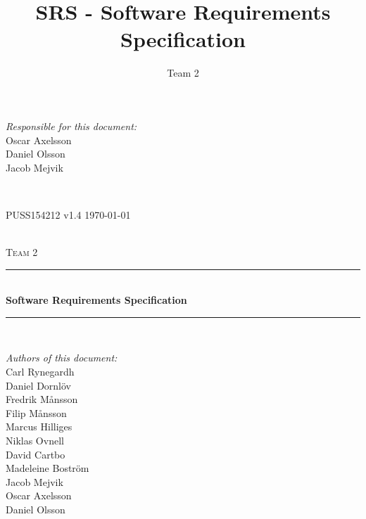\documentclass[a4paper]{article}
\title{SRS - Software Requirements Specification}
\author{Team 2}
\begin{document}
\begin{titlepage}
\newcommand{\HRule}{\rule{\linewidth}{0.5mm}}

\begin{minipage}{0.5\textwidth}
\begin{flushleft} %
\textit{Responsible for this document:}\\
Oscar Axelsson \\
Daniel Olsson \\
Jacob Mejvik
\end{flushleft}
\end{minipage}
~
\begin{minipage}{0.4\textwidth}
\begin{flushright}
PUSS154212 v1.4
\today
\end{flushright}
\end{minipage}\\[3cm]

\centering
\textsc{\LARGE Team 2}\\[0.5cm]

\HRule \\[0.4cm]
{ \huge \bfseries Software Requirements Specification}\\[0.4cm] %
\HRule \\[1.5cm]

\vfill
\begin{flushleft}
\textit{Authors of this document:}\\
Carl Rynegardh \\
Daniel Dornlöv \\
Fredrik Månsson \\
Filip Månsson \\
Marcus Hilliges \\
Niklas Ovnell \\
David Cartbo \\
Madeleine Boström \\
Jacob Mejvik \\
Oscar Axelsson \\
Daniel Olsson
\end{flushleft}



\end{titlepage}
\setcounter{tocdepth}{2}
\end{document}

